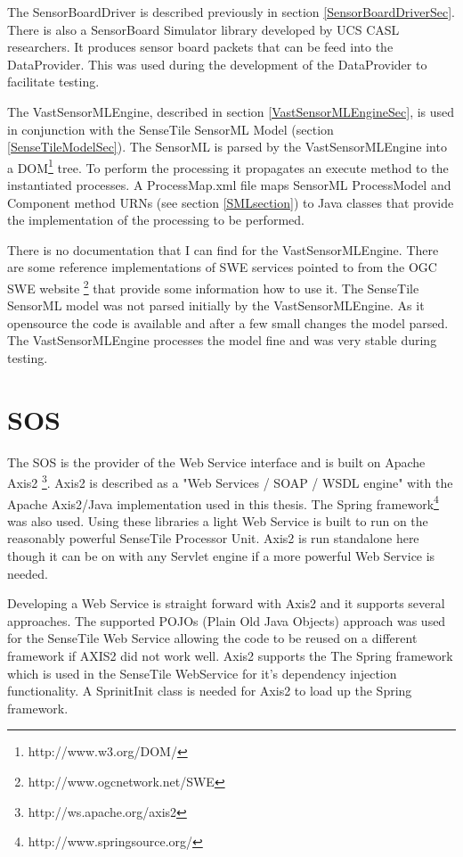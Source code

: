 \documentclass[]{final_report}
\begin{document}
The SensorBoardDriver is described previously in section \ref{SensorBoardDriverSec}. There is also a SensorBoard Simulator library developed by UCS CASL researchers. It produces sensor board packets that can be feed into the DataProvider. This was used during the development of the DataProvider to facilitate testing. 

The VastSensorMLEngine, described in section \ref{VastSensorMLEngineSec}, is used in conjunction with the SenseTile SensorML Model (section \ref{SenseTileModelSec}). The SensorML is parsed by the VastSensorMLEngine into a DOM\footnote{http://www.w3.org/DOM/} tree. To perform the processing it propagates an execute method to the instantiated processes. A ProcessMap.xml file maps SensorML ProcessModel and Component method  URNs  (see section \ref{SMLsection}) to Java classes that provide the implementation of the processing to be performed. 

There is no documentation that I can find for the VastSensorMLEngine. There are some reference implementations of SWE services pointed to from the OGC SWE website \footnote{http://www.ogcnetwork.net/SWE} that provide some information how to use it. The SenseTile SensorML model was not parsed initially by the VastSensorMLEngine. As it opensource the code is available and after a few small changes the model parsed. The VastSensorMLEngine processes the model fine and was very stable during testing.


\section{SOS}
The SOS is the provider of the Web Service interface and is built on Apache Axis2 \footnote{http://ws.apache.org/axis2}. 
Axis2 is described as a "Web Services / SOAP / WSDL engine"  with the Apache Axis2/Java implementation used in this thesis. The Spring framework\footnote{http://www.springsource.org/} was also used. Using these libraries a light Web Service is built to run on the reasonably powerful SenseTile Processor Unit. Axis2 is run standalone here though it can be on with any Servlet engine if a more powerful Web Service is needed.

Developing a Web Service is straight forward with Axis2 and it supports several approaches. The supported POJOs (Plain Old Java Objects) approach was used for the SenseTile Web Service allowing the code to be reused on a different framework if AXIS2 did not work well. Axis2 supports the The Spring framework which is used in the SenseTile WebService for it's dependency injection functionality. A SprinitInit class is needed for Axis2 to load up the Spring framework.
\end{document}
